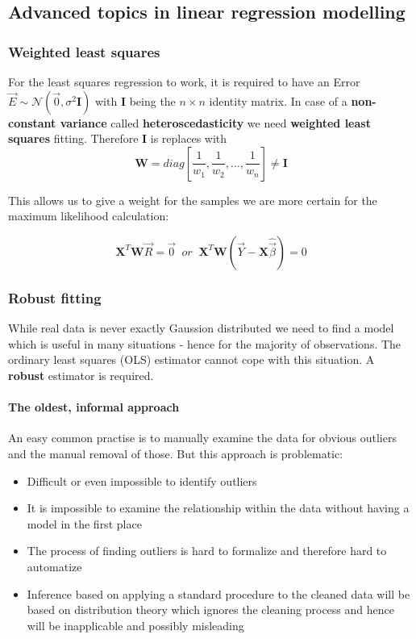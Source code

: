 \subsection{Advanced topics in linear regression modelling}

\subsubsection{Weighted least squares}

For the least squares regression to work, it is required to have an Error $\vec{E} \sim \mathcal{N}(\vec{0}, \sigma^2\bm{I})$ with $\bm{I}$ being the $n\times n$ identity matrix. In case of a \textbf{non-constant variance} called \textbf{heteroscedasticity} we need \textbf{weighted least squares} fitting. Therefore $\bm{I}$ is replaces with
\begin{equation*}
\bm{W}=diag[\frac{1}{w_1},\frac{1}{w_2}, ..., \frac{1}{w_n}] \neq \bm{I}
\end{equation*}

This allows us to give a weight for the samples we are more certain for the maximum likelihood calculation:

\begin{equation*}
\bm{X}^T\bm{W}\vec{R} = \vec{0}\;\; or \;\;
\bm{X}^T\bm{W}(\vec{Y}-\bm{X}\hat{\vec{\beta}}) = 0
\end{equation*}

\subsubsection{Robust fitting}
While real data is never exactly Gaussion distributed we need to find a model which is useful in many situations - hence for the majority of observations. The ordinary least squares (OLS) estimator cannot cope with this situation. A \textbf{robust} estimator is required.

\paragraph{The oldest, informal approach}

An easy common practise is to manually examine the data for obvious outliers and the manual removal of those. But this approach is problematic:
\begin{itemize}
	\tightlist
	\item Difficult or even impossible to identify outliers
	\item It is impossible to examine the relationship within the data without having a model in the first place
	\item The process of finding outliers is hard to formalize and therefore hard to automatize
	\item Inference based on applying a standard procedure to the cleaned data will be based on distribution theory which ignores the cleaning process and hence will be inapplicable and possibly misleading
\end{itemize}

